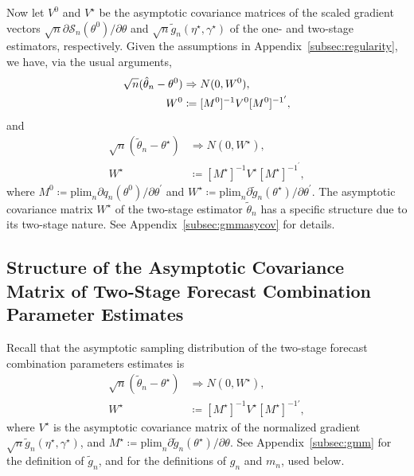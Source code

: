 \documentclass[12pt]{article}
\theoremstyle{definition}
\theoremstyle{remark}
\renewcommand{\appendixname}{Appendix}
\begin{document}
Now let $V^0$ and $V^{\star}$ be the asymptotic covariance matrices of the scaled gradient vectors $\sqrt{n} \partial \mathcal{S}_n(\theta^0) / \partial \theta$ and $\sqrt{n} \tilde{g}_n(\eta^{\star}, \gamma^{\star})$ of the one- and two-stage estimators, respectively. Given the assumptions in \appendixname\ \ref{subsec:regularity}, we have, via the usual arguments, 
\begin{align}
\sqrt{n}(\hat{\theta}_n - \theta^0) & \Rightarrow N(0, W^0),  \notag \\
W^0 & \coloneqq [M^0]^{-1} V^0 [M^0]^{{-1}^{\prime}},  \label{eqn:onestagew}
\end{align}
and 
\begin{align*}
\sqrt{n}(\tilde{\theta}_n - \theta^{\star}) & \Rightarrow N(0, W^{\star}), \\
W^{\star} & \coloneqq [M^{\star}]^{-1} V^{\star} [M^{\star}]^{{-1}^{\prime}},
\end{align*}
where $M^0 \coloneqq \mathrm{plim}_n \partial q_n(\theta^0) / \partial \theta^{\prime}$ and $W^{\star} \coloneqq \mathrm{plim}_n \partial \tilde{g}_n(\theta^{\star}) / \partial \theta^{\prime}$. The asymptotic covariance matrix $W^{\star}$ of the two-stage estimator $\tilde{\theta}_n$ has a specific structure due to its two-stage nature. See \appendixname\ \ref{subsec:gmmasycov} for details.

\subsection{Structure of the Asymptotic Covariance Matrix of Two-Stage Forecast Combination Parameter Estimates\label{subsec:gmmasycov}}

Recall that the asymptotic sampling distribution of the two-stage forecast combination parameters estimates is 
\begin{align*}
\sqrt{n}(\tilde{\theta}_n - \theta^{\star}) & \Rightarrow N(0, W^{\star}), \\
W^{\star} & \coloneqq [M^{\star}]^{-1} V^{\star} [M^{\star}]^{-1 \prime},
\end{align*}
where $V^{\star}$ is the asymptotic covariance matrix of the normalized gradient $\sqrt{n} \tilde{g}_{n}(\eta^{\star}, \gamma^{\star})$, and $M^{\star} \coloneqq \mathrm{plim}_n \partial \tilde{g}_{n} (\theta^{\star}) / \partial \theta$. See \appendixname\ \ref{subsec:gmm} for the definition of $\tilde{g}_n$, and for the definitions of $g_n$ and $m_n$, used below.
\end{document}
